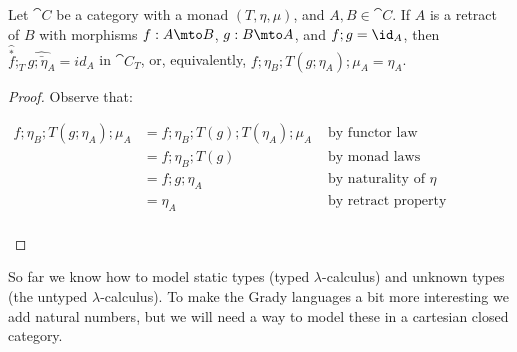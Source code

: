 \begin{lemma}
  Let $\cat{C}$ be a category with a monad $(T, \eta, \mu)$, and $A, B \in \cat{C}$.
  If $A$ is a retract of $B$ with morphisms $f : A \mto B$, $g : B \mto A$, and
  $f ; g = \id_A$, then $\hat{\overset{*}{f}} ;_T \hat{\bar{g;\eta_A}} = id_A$ in $\cat{C}_T$,
  or, equivalently, $f ; \eta_B ; T(g; \eta_A) ; \mu_A = \eta_A$.
\end{lemma}
\begin{proof}
  Observe that:
  \begin{center}
    \begin{math}
      \begin{array}{rlr}
        f;\eta_B;T(g;\eta_A);\mu_A & = f;\eta_B;T(g);T(\eta_A);\mu_A & \text{ by functor law} \\
        & = f; \eta_B ; T(g) & \text{ by monad laws} \\
        & = f; g ; \eta_A & \text{ by naturality of } \eta \\
        & = \eta_A & \text{ by retract property } \\
      \end{array}
    \end{math}
  \end{center}
\end{proof}

So far we know how to model static types (typed $\lambda$-calculus)
and unknown types (the untyped $\lambda$-calculus).  To make the Grady
languages a bit more interesting we add natural numbers, but we will
need a way to model these in a cartesian closed category.

